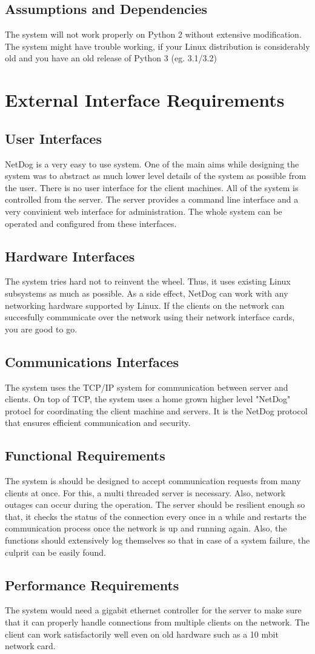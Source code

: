 \documentclass{scrreprt}
\begin{document}
\section{Assumptions and Dependencies}
The system will not work properly on Python 2 without extensive modification.
The system might have trouble working, if your Linux distribution is
considerably old and you have an old release of Python 3 (eg. 3.1/3.2)

\chapter{External Interface Requirements}

\section{User Interfaces}
NetDog is a very easy to use system. One of the main aims while designing the
system was to abstract as much lower level details of the system as possible
from the user. There is no user interface for the client machines. All of the
system is controlled from the server. The server provides a command line
interface and a very convinient web interface for administration. The whole
system can be operated and configured from these interfaces.

\section{Hardware Interfaces}
The system tries hard not to reinvent the wheel. Thus, it uses existing Linux
subsystems as much as possible. As a side effect, NetDog can work with any
networking hardware supported by Linux. If the clients on the network can
succesfully communicate over the network using their network interface cards,
you are good to go.

\section{Communications Interfaces}
The system uses the TCP/IP system for communication between server and clients.
On top of TCP, the system uses a home grown higher level "NetDog" protocl for
coordinating the client machine and servers. It is the NetDog protocol that
ensures efficient communication and security.

\section{Functional Requirements}
The system is should be designed to accept communication requests from many
clients at once. For this, a multi threaded server is necessary. Also, network
outages can occur during the operation. The server should be resilient enough
so that, it checks the status of the connection every once in a while and
restarts the communication process once the network is up and running again.
Also, the functions should extensively log themselves so that in case of a
system failure, the culprit can be easily found.

\section{Performance Requirements}
The system would need a gigabit ethernet controller for the server to make sure
that it can properly handle connections from multiple clients on the network.
The client can work satisfactorily well even on old hardware such as a 10 mbit
network card.
\end{document}
